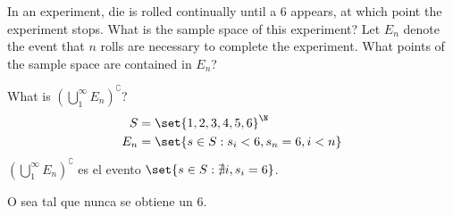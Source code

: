 \item In an experiment, die is rolled continually until a 6 appears, at which point the experiment stops. What is the sample space of this experiment? Let $E_n$ denote the event that $n$ rolls are necessary to complete the experiment. What points of the sample space are contained in $E_n$?

What is $\displaystyle \left( \bigcup_1^\infty E_n \right)^\complement $?
\begin{align*}
    S &= \set{1,2,3,4,5,6}^\N\\
    E_n &= \set{s \in S : s_i < 6, s_n = 6, i < n}
\end{align*}
$\displaystyle \left( \bigcup_1^\infty E_n \right)^\complement $ es el evento $\set{s \in S : \nexists i, s_i = 6}$.

O sea tal que nunca se obtiene un 6.